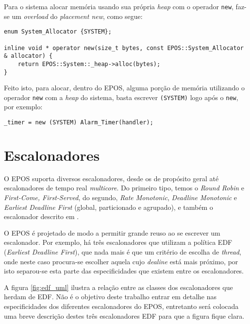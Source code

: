 Para o sistema alocar memória usando sua própria \emph{heap} com o operador \verb+new+, faz-se um \emph{overload} do \emph{placement new}, como segue:

\begin{lstlisting}
enum System_Allocator {SYSTEM};

inline void * operator new(size_t bytes, const EPOS::System_Allocator & allocator) {
    return EPOS::System::_heap->alloc(bytes);
}
\end{lstlisting}

Feito isto, para alocar, dentro do EPOS, alguma porção de memória utilizando o operador \verb+new+ com a \emph{heap} do sistema, basta escrever \verb+(SYSTEM)+ logo após o \verb+new+, por exemplo:

\begin{lstlisting}
_timer = new (SYSTEM) Alarm_Timer(handler);
\end{lstlisting}


\section{Escalonadores}

O EPOS suporta diversos escalonadores, desde os de propósito geral até escalonadores de tempo real \emph{multicore}.
Do primeiro tipo, temos o \emph{Round Robin} e \emph{First-Come, First-Served}, do segundo, \emph{Rate Monotonic}, \emph{Deadline Monotonic} e \emph{Earliest Deadline First} (global, particionado e agrupado), e também o escalonador descrito em \cite{gio}.


O EPOS é projetado de modo a permitir grande reuso ao se escrever um escalonador. Por exemplo, há três escalonadores que utilizam a política EDF (\emph{Earliest Deadline First}), que nada mais é que um critério de escolha de \emph{thread}, onde neste caso procura-se escolher aquela cujo \emph{dealine} está mais próximo, por isto separou-se esta parte das especificidades que existem entre os escalonadores. 

A figura \ref{fig:edf_uml} ilustra a relação entre as classes dos escalonadores que herdam de EDF.  Não é o objetivo deste trabalho entrar em detalhe nas especificidades dos diferentes escalonadores do EPOS, entretanto será colocada uma breve descrição destes três escalonadores EDF para que a figura fique clara.

